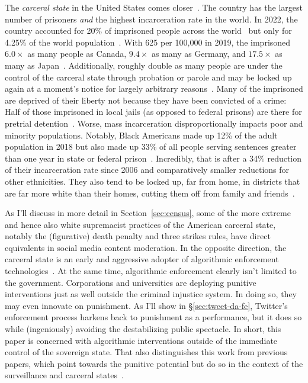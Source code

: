 The \emph{carceral state} in the United States comes closer~\cite{Simon2007}.
The country has the largest number of prisoners \emph{and} the highest
incarceration rate in the world. In 2022, the country accounted for 20\% of
imprisoned people across the world~\cite{SawyerWagner2022} but only for 4.25\%
of the world population~\cite{Worldometer2023}. With 625 per 100,000 in 2019,
the  imprisoned $6.0\times$ as many people as Canada, $9.4\times$ as many
as Germany, and $17.5\times$ as many as Japan~\cite{WorldPrisonBrief2023}.
Additionally, roughly double as many people are under the control of the
carceral state through probation or parole and may be locked up again at a
moment's notice for largely arbitrary reasons~\cite{SawyerWagner2022}. Many of
the imprisoned are deprived of their liberty not because they have been
convicted of a crime: Half of those imprisoned in local jails (as opposed to
federal prisons) are there for pretrial detention~\cite{SawyerWagner2022}.
Worse, mass incarceration disproportionally impacts poor and minority
populations. Notably, Black Americans made up 12\% of the  adult
population in 2018 but also made up 33\% of all people serving sentences greater
than one year in state or federal prison~\cite{Gramlich2020}. Incredibly, that
is after a 34\% reduction of their incarceration rate since 2006 and
comparatively smaller reductions for other ethnicities. They also tend to be
locked up, far from home, in districts that are far more white than their homes,
cutting them off from family and friends~\cite{WagnerKopf2015}.

As I'll discuss in more detail in Section~\ref{sec:census}, some of the more
extreme and hence also white supremacist practices of the American carceral
state, notably the (figurative) death penalty and three strikes rules, have
direct equivalents in social media content moderation. In the opposite
direction, the carceral state is an early and aggressive adopter of algorithmic
enforcement
technologies~\cite{AngwinLarsonea2016,EPIC2020,Hao2019,ReddenODonovanDixea2020,Yampolskiy2016}.
At the same time, algorithmic enforcement clearly isn't limited to the
government. Corporations and universities are deploying punitive interventions
just as well outside the criminal injustice system. In doing so, they may even
innovate on punishment. As I'll show in \S\ref{sec:tweet-da-fe}, Twitter's
enforcement process harkens back to punishment as a performance, but it does so
while (ingeniously) avoiding the destabilizing public spectacle. In short, this
paper is concerned with algorithmic interventions outside of the immediate
control of the sovereign state. That also distinguishes this work from previous
papers, which point towards the punitive potential but do so in the context of
the surveillance and carceral
states~\cite{DehlendorfGerety2021,McElroyWhittakerea2021}.

